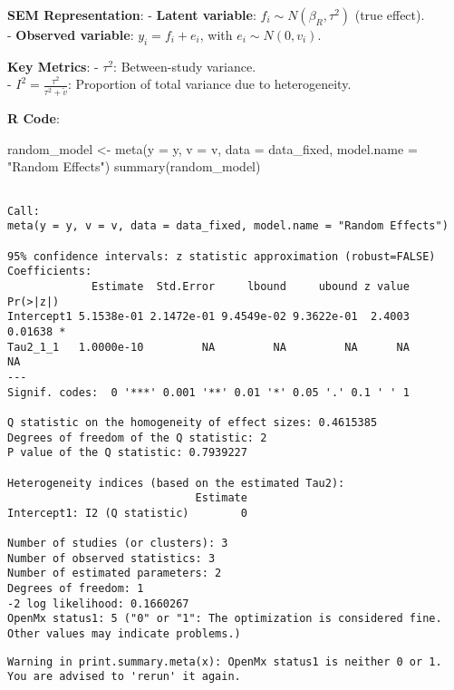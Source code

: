 \documentclass[
  letterpaper,
  DIV=11,
  numbers=noendperiod]{scrartcl}
\newenvironment{Shaded}{\begin{snugshade}}{\end{snugshade}}
\newcommand{\AttributeTok}[1]{\textcolor[rgb]{0.40,0.45,0.13}{#1}}
\newcommand{\FunctionTok}[1]{\textcolor[rgb]{0.28,0.35,0.67}{#1}}
\newcommand{\NormalTok}[1]{\textcolor[rgb]{0.00,0.23,0.31}{#1}}
\newcommand{\OtherTok}[1]{\textcolor[rgb]{0.00,0.23,0.31}{#1}}
\newcommand{\StringTok}[1]{\textcolor[rgb]{0.13,0.47,0.30}{#1}}
\begin{document}
\textbf{SEM Representation}: - \textbf{Latent variable}:
\(f_i \sim N(\beta_R, \tau^2)\) (true effect).\\
- \textbf{Observed variable}: \(y_i = f_i + e_i\), with
\(e_i \sim N(0, v_i)\).

\textbf{Key Metrics}: - \(\tau^2\): Between-study variance.\\
- \(I^2 = \frac{\tau^2}{\tau^2 + \tilde{v}}\): Proportion of total
variance due to heterogeneity.

\textbf{R Code}:

\begin{Shaded}
\begin{Highlighting}[]
\NormalTok{random\_model }\OtherTok{\textless{}{-}} \FunctionTok{meta}\NormalTok{(}\AttributeTok{y =}\NormalTok{ y, }\AttributeTok{v =}\NormalTok{ v, }\AttributeTok{data =}\NormalTok{ data\_fixed, }\AttributeTok{model.name =} \StringTok{"Random Effects"}\NormalTok{)}
\FunctionTok{summary}\NormalTok{(random\_model)}
\end{Highlighting}
\end{Shaded}

\begin{verbatim}

Call:
meta(y = y, v = v, data = data_fixed, model.name = "Random Effects")

95% confidence intervals: z statistic approximation (robust=FALSE)
Coefficients:
             Estimate  Std.Error     lbound     ubound z value Pr(>|z|)  
Intercept1 5.1538e-01 2.1472e-01 9.4549e-02 9.3622e-01  2.4003  0.01638 *
Tau2_1_1   1.0000e-10         NA         NA         NA      NA       NA  
---
Signif. codes:  0 '***' 0.001 '**' 0.01 '*' 0.05 '.' 0.1 ' ' 1

Q statistic on the homogeneity of effect sizes: 0.4615385
Degrees of freedom of the Q statistic: 2
P value of the Q statistic: 0.7939227

Heterogeneity indices (based on the estimated Tau2):
                             Estimate
Intercept1: I2 (Q statistic)        0

Number of studies (or clusters): 3
Number of observed statistics: 3
Number of estimated parameters: 2
Degrees of freedom: 1
-2 log likelihood: 0.1660267 
OpenMx status1: 5 ("0" or "1": The optimization is considered fine.
Other values may indicate problems.)
\end{verbatim}

\begin{verbatim}
Warning in print.summary.meta(x): OpenMx status1 is neither 0 or 1. You are advised to 'rerun' it again.
\end{verbatim}
\end{document}
